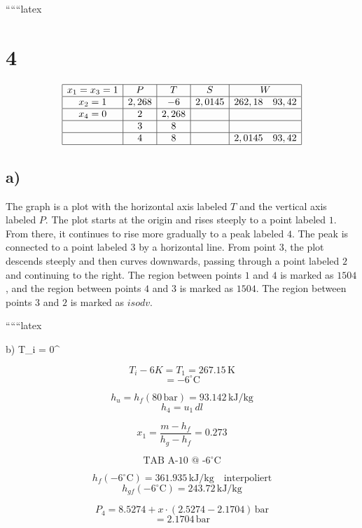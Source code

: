 
``````latex


\section*{4}

\[
\begin{array}{|c|c|c|c|c|}
\hline
x_1 = x_3 = 1 & P & T & S & W \\
\hline
x_2 = 1 & 2,268 & -6 & 2,0145 & 262,18 \quad 93,42 \\
\hline
x_4 = 0 & 2 & 2,268 & & \\
\hline
& 3 & 8 & & \\
\hline
& 4 & 8 & & 2,0145 \quad 93,42 \\
\hline
\end{array}
\]

\subsection*{a)}

The graph is a plot with the horizontal axis labeled \( T \) and the vertical axis labeled \( P \). The plot starts at the origin and rises steeply to a point labeled \( 1 \). From there, it continues to rise more gradually to a peak labeled \( 4 \). The peak is connected to a point labeled \( 3 \) by a horizontal line. From point \( 3 \), the plot descends steeply and then curves downwards, passing through a point labeled \( 2 \) and continuing to the right. The region between points \( 1 \) and \( 4 \) is marked as \( 1504 \), and the region between points \( 4 \) and \( 3 \) is marked as \( 1504 \). The region between points \( 3 \) and \( 2 \) is marked as \( isodv \).

``````latex


b) \quad T_i = 0^\circ {}

\[
T_i - 6K = T_1 = 267.15 \, \text{K}
\]
\[
=-6^\circ \text{C}
\]

\[
h_u = h_f (80 \, \text{bar}) = 93.142 \, \text{kJ/kg}
\]
\[
h_4 = u_1 \, dl
\]

\[
x_1 = \frac{m - h_f}{h_g - h_f} = 0.273
\]

\[
\text{TAB A-10 @ -6}^\circ \text{C}
\]

\[
h_f (-6^\circ \text{C}) = 361.935 \, \text{kJ/kg} \quad \text{interpoliert}
\]
\[
h_{gf} (-6^\circ \text{C}) = 243.72 \, \text{kJ/kg}
\]

\[
P_4 = 8.5274 + x \cdot (2.5274 - 2.1704) \, \text{bar}
\]
\[
= 2.1704 \, \text{bar}
\]

